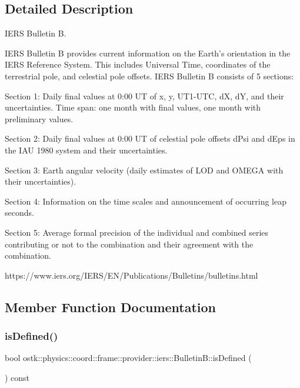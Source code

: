 \subsection{Detailed Description}
I\+E\+RS Bulletin B. 

I\+E\+RS Bulletin B provides current information on the Earth’s orientation in the I\+E\+RS Reference System. This includes Universal Time, coordinates of the terrestrial pole, and celestial pole offsets. I\+E\+RS Bulletin B consists of 5 sections\+:

Section 1\+: Daily final values at 0\+:00 UT of x, y, U\+T1-\/\+U\+TC, dX, dY, and their uncertainties. Time span\+: one month with final values, one month with preliminary values.

Section 2\+: Daily final values at 0\+:00 UT of celestial pole offsets d\+Psi and d\+Eps in the I\+AU 1980 system and their uncertainties.

Section 3\+: Earth angular velocity (daily estimates of L\+OD and O\+M\+E\+GA with their uncertainties).

Section 4\+: Information on the time scales and announcement of occurring leap seconds.

Section 5\+: Average formal precision of the individual and combined series contributing or not to the combination and their agreement with the combination.

https\+://www.iers.\+org/\+I\+E\+R\+S/\+E\+N/\+Publications/\+Bulletins/bulletins.html 

\subsection{Member Function Documentation}
\mbox{\label{classostk_1_1physics_1_1coord_1_1frame_1_1provider_1_1iers_1_1_bulletin_b_ab90d582229f254830583cd9ce65d8dab}} 
\subsubsection{\texorpdfstring{is\+Defined()}{isDefined()}}
{\footnotesize\ttfamily bool ostk\+::physics\+::coord\+::frame\+::provider\+::iers\+::\+Bulletin\+B\+::is\+Defined (\begin{DoxyParamCaption}{ }\end{DoxyParamCaption}) const}

